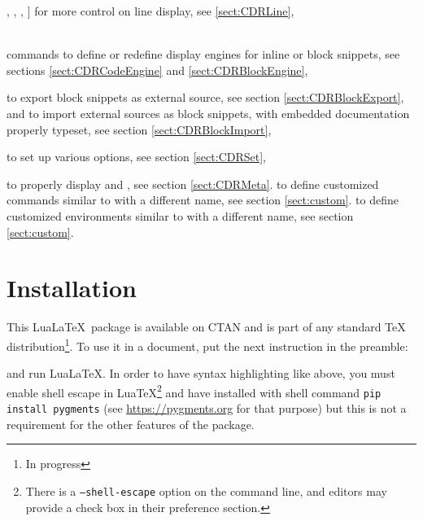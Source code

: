 \documentclass{article}
\begin{document}
\begin{description}
{,
,
,
}]
for more control on line display, see \ref{sect:CDRLine},
\item[{%
\CDRCodeUse[tags=src]{CDRCodeEngineNew},
\CDRCodeUse{CDRCodeEngineRenew},
\CDRCodeUse{CDRBlockEngineNew},
\CDRCodeUse{CDRBlockEngineRenew}%
}]\strut\\
commands to define or redefine display engines
for inline or block snippets,
see sections \ref{sect:CDRCodeEngine} and \ref{sect:CDRBlockEngine},
\item[\CDRCodeUse{CDRBlockExport}, \CDRCodeUse{CDRBlockImport}]
to export block snippets as external source,
see section \ref{sect:CDRBlockExport},
and to import external sources as block snippets,
with embedded documentation properly typeset,
see section \ref{sect:CDRBlockImport},
\item[\CDRCodeUse{CDRSet}]
to set up various options,
see section \ref{sect:CDRSet},
\item[\CDRCodeUse{CDRMeta}, \CDRCodeUse{CDRMetaFormat}] 
to properly display  and ,
see section \ref{sect:CDRMeta}.
 to define customized commands similar to  with a different name, see section \ref{sect:custom}.
 to define customized environments similar to   with a different name, see section \ref{sect:custom}.
\end{description}

\section{Installation}
This Lua\LaTeX\ package is available on CTAN and is part of any standard \TeX{} distribution\footnote{In progress}. To use it in a document, put the next instruction in the preamble:
\begin{CDRBlock}[numbers=none,lang=latex,style=autumn]
\RequirePackage{coder}
\end{CDRBlock}
and run Lua\LaTeX{}.
In order to have syntax highlighting like above,
you must enable shell escape in Lua\TeX\footnote{There is a \texttt{--shell-escape} option on the command line, and editors may provide a check box in their preference section.}
and have  installed with shell command
\texttt{pip install pygments}
(see \url{https://pygments.org} for that purpose)
but this is not a requirement for the other features of the  package.
\end{document}
